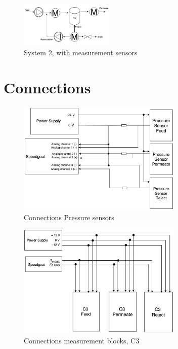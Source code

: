 \begin{figure}[h]
    \centering
    \includegraphics[width=0.4\textwidth]{MeasSys2}
    \caption{System 2, with measurement sensors}
    \label{fig:MeasSys2}
\end{figure}

\section{Connections} \label{Connections}

\begin{figure}[h]
    \centering
    \includegraphics[width=0.7\textwidth]{PressConn}
    \caption{Connections Pressure sensors}
    \label{fig:PressConn}
\end{figure}

\begin{figure}[h]
    \centering
    \includegraphics[width=0.7\textwidth]{C3Conn}
    \caption{Connections measurement blocks, C3}
    \label{fig:C3Conn}
\end{figure}

